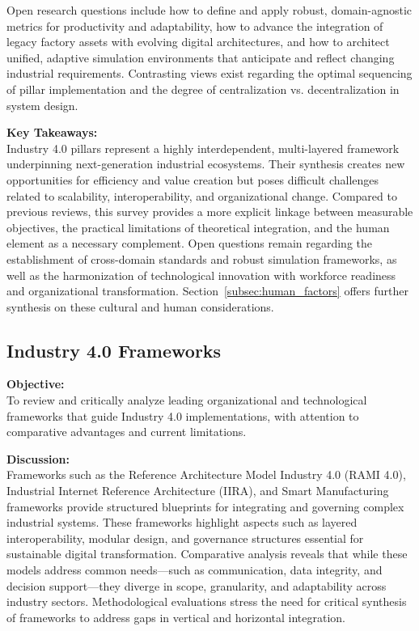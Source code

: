 \documentclass[sigconf]{acmart}
\begin{document}
Open research questions include how to define and apply robust, domain-agnostic metrics for productivity and adaptability, how to advance the integration of legacy factory assets with evolving digital architectures, and how to architect unified, adaptive simulation environments that anticipate and reflect changing industrial requirements. Contrasting views exist regarding the optimal sequencing of pillar implementation and the degree of centralization vs. decentralization in system design.

\textbf{Key Takeaways:}\\
Industry 4.0 pillars represent a highly interdependent, multi-layered framework underpinning next-generation industrial ecosystems. Their synthesis creates new opportunities for efficiency and value creation but poses difficult challenges related to scalability, interoperability, and organizational change. Compared to previous reviews, this survey provides a more explicit linkage between measurable objectives, the practical limitations of theoretical integration, and the human element as a necessary complement. Open questions remain regarding the establishment of cross-domain standards and robust simulation frameworks, as well as the harmonization of technological innovation with workforce readiness and organizational transformation. Section~\ref{subsec:human_factors} offers further synthesis on these cultural and human considerations.

\subsection{Industry 4.0 Frameworks}
\textbf{Objective:}\\
To review and critically analyze leading organizational and technological frameworks that guide Industry 4.0 implementations, with attention to comparative advantages and current limitations.

\textbf{Discussion:}\\
Frameworks such as the Reference Architecture Model Industry 4.0 (RAMI 4.0), Industrial Internet Reference Architecture (IIRA), and Smart Manufacturing frameworks provide structured blueprints for integrating and governing complex industrial systems. These frameworks highlight aspects such as layered interoperability, modular design, and governance structures essential for sustainable digital transformation. Comparative analysis reveals that while these models address common needs—such as communication, data integrity, and decision support—they diverge in scope, granularity, and adaptability across industry sectors. Methodological evaluations stress the need for critical synthesis of frameworks to address gaps in vertical and horizontal integration.
\end{document}
